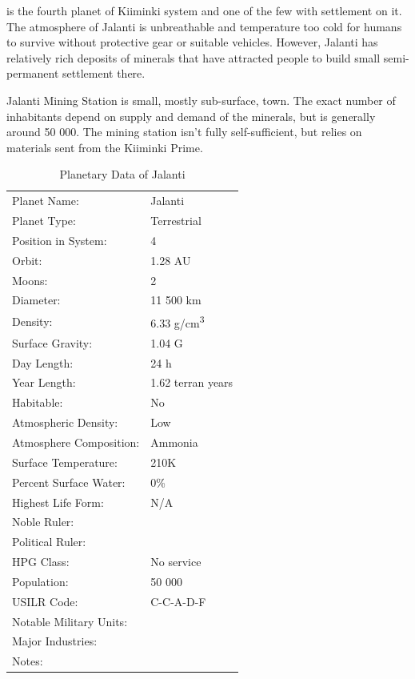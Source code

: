 \documentclass{tufte-book}
\begin{document}
 is the fourth planet of Kiiminki system and one of
the few with settlement on it. The atmosphere of Jalanti is unbreathable
and temperature too cold for humans to survive without protective gear
or suitable vehicles. However, Jalanti has relatively rich deposits of
minerals that have attracted people to build small semi-permanent
settlement there. 

Jalanti Mining Station is small, mostly sub-surface, town. The exact
number of inhabitants depend on supply and demand of the minerals, but
is generally around 50 000. The mining station isn't fully
self-sufficient, but relies on materials sent from the Kiiminki Prime.

\bigskip
\begin{table}
\begin{minipage}{\textwidth}
\begin{center}
\begin{tabular}{ll}
\toprule
Planet Name: & Jalanti \\
Planet Type: & Terrestrial \\
Position in System: & 4 \\
Orbit: & 1.28 AU \\
Moons: & 2 \\
Diameter: & 11 500 km \\
Density: & 6.33 g/cm\textsuperscript{3} \\
Surface Gravity: & 1.04 G \\
Day Length: & 24 h \\
Year Length: & 1.62 terran years \\
Habitable: & No \\
\quad Atmospheric Density: & Low \\
\quad Atmosphere Composition: & Ammonia \\
\quad Surface Temperature: & 210K \\
\quad Percent Surface Water: & 0\% \\
\quad Highest Life Form: & N/A \\
\toprule
Noble Ruler: & \\
Political Ruler: & \\
HPG Class: & No service \\
Population: & 50 000 \\
USILR Code: & C-C-A-D-F \\
Notable Military Units: & \\
Major Industries: & \\
Notes: & \\

\bottomrule
\end{tabular}
\end{center}
\end{minipage}
\caption{Planetary Data of Jalanti}
\end{table}
\end{document}
